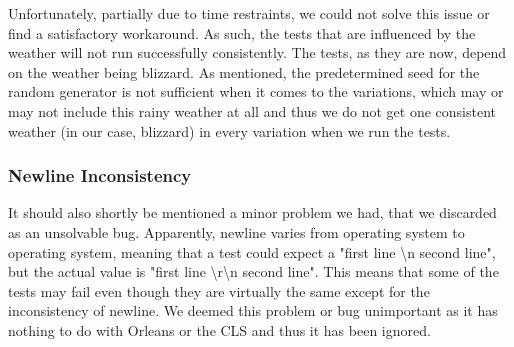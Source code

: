 Unfortunately, partially due to time restraints, we could not solve this issue or find a satisfactory workaround. As such, the tests that are influenced by the weather will not run successfully consistently. The tests, as they are now, depend on the weather being blizzard. As mentioned, the predetermined seed for the random generator is not sufficient when it comes to the variations, which may or may not include this rainy weather at all and thus we do not get one consistent weather (in our case, blizzard) in every variation when we run the tests.
\subsubsection{Newline Inconsistency}
It should also shortly be mentioned a minor problem we had, that we discarded as an unsolvable bug. Apparently, newline varies from operating system to operating system, meaning that a test could expect a "first line \textbackslash n second line", but the actual value is "first line \textbackslash r\textbackslash n second line". This means that some of the tests may fail even though they are virtually the same except for the inconsistency of newline. We deemed this problem or bug unimportant as it has nothing to do with Orleans or the CLS and thus it has been ignored.

